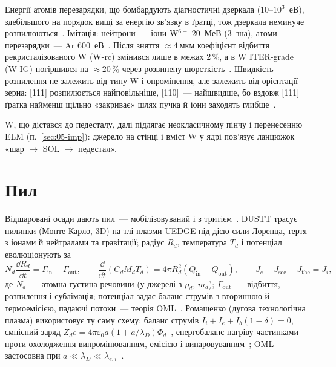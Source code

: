 \begin{corpusexample}
Енергії атомів перезарядки, що бомбардують діагностичні дзеркала ($10$--$10^3$~еВ), здебільшого на порядок вищі за енергію зв'язку в ґратці, тож дзеркала неминуче розпилюються~\cite[с.~3]{Belyaeva2016}. Імітація: нейтрони~--- іони W$^{6+}$ 20~МеВ (3~зна), атоми перезарядки~--- Ar 600~еВ~\cite[с.~5]{Belyaeva2016}. Після зняття $\approx\SI{4}{мкм}$ коефіцієнт відбиття рекристалізованого W (W-rc) змінився лише в межах 2\,\%, а в W ITER-grade (W-IG) погіршився на $\approx20\,\%$ через розвинену шорсткість~\cite[с.~23--24]{Belyaeva2016}. Швидкість розпилення не залежить від типу W і опромінення, але залежить від орієнтації зерна: [111] розпилюється найповільніше, [110]~--- найшвидше, бо вздовж [111] ґратка найменш щільно «закриває» шлях пучка й іони заходять глибше~\cite[с.~24]{Belyaeva2016}.
\end{corpusexample}

W, що дістався до педесталу, далі підлягає неокласичному пінчу і перенесенню ELM (п.~\ref{sec:05-imp}): джерело на стінці і вміст W у ядрі пов'язує ланцюжок «шар $\to$ SOL $\to$ педестал».

\section{Пил}\label{sec:08-dust}

Відшаровані осади дають пил~--- мобілізовуваний і з тритієм~\cite[с.~35]{AhoMantila2011}. DUSTT трасує пилинки (Монте-Карло, 3D) на тлі плазми UEDGE під дією сили Лоренца, тертя з іонами й нейтралами та гравітації; радіус $R_d$, температура $T_d$ і потенціал еволюціонують за~\cite[с.~4--5]{Pigarov2006}
\begin{equation}\label{eq:08-dust}
  N_d\frac{\dd R_d}{\dd t}=\Gamma_{\mathrm{in}}-\Gamma_{\mathrm{out}},\qquad
  \frac{\dd}{\dd t}(C_dM_dT_d)=4\pi R_d^2(Q_{\mathrm{in}}-Q_{\mathrm{out}}),\qquad
  J_e-J_{\mathrm{see}}-J_{\mathrm{the}}=J_i ,
\end{equation}
де $N_d$~--- атомна густина речовини (у джерелі з $\rho_d$, $m_d$); $\Gamma_{\mathrm{out}}$~--- відбиття, розпилення і сублімація; потенціал задає баланс струмів з вторинною й термоемісією, падаючі потоки~--- теорія OML~\cite[с.~5]{Pigarov2006}. Ромащенко (дугова технологічна плазма) використовує ту саму схему: баланс струмів $I_i+I_e+I_b(1-\delta)=0$, ємнісний заряд $Z_de=4\pi\varepsilon_0a(1+a/\lambda_D)\Phi_d$~\cite[с.~10, (2), (4)]{Romashchenko2021}, енергобаланс нагріву частинками проти охолодження випромінюванням, емісією і випаровуванням~\cite[с.~13, (9)--(10)]{Romashchenko2021}; OML застосовна при $a\ll\lambda_D\ll\lambda_{e,i}$~\cite[с.~9, (1)]{Romashchenko2021}.

